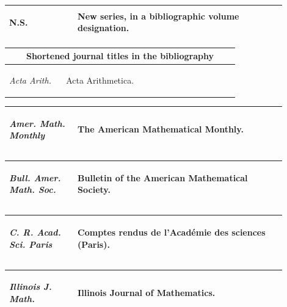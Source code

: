 \documentclass[11pt,reqno]{amsart}
\theoremstyle{blueplain}
\numberwithin{equation}{section}
\def\hyperlink#1#2{#2}}
\begin{document}
\par\setlength{\parskip}{0pt}\nointerlineskip
\noindent
\begin{tabular}{|@{}p{0.22500\linewidth}|p{0.67500\linewidth}|}\hline
\hypertarget{abbr:N.S.}{}\hyperlink{abbr-source:Srinivasan1961}{\textsf{N.S.}} & New series, in a bibliographic volume designation.\\\hline
\end{tabular}%
\par\setlength{\parskip}{0pt}\nointerlineskip
\noindent
\begin{tabular}{|@{}p{0.22500\linewidth}|p{0.67500\linewidth}|}\hline
\multicolumn{2}{|c|}{\textbf{Shortened journal titles in the bibliography}}\\\hline
\hypertarget{abbr:journal-Acta-Arith}{}\hyperlink{abbr-source:Haneke1962}{\emph{Acta Arith.}} & Acta Arithmetica.\\\hline
\end{tabular}%
\par\setlength{\parskip}{0pt}\nointerlineskip
\noindent
\begin{tabular}{|@{}p{0.22500\linewidth}|p{0.67500\linewidth}|}\hline
\hypertarget{abbr:journal-Amer-Math-Monthly}{}\hyperlink{abbr-source:Wright1951}{\emph{Amer. Math. Monthly}} & The American Mathematical Monthly.\\\hline
\end{tabular}%
\par\setlength{\parskip}{0pt}\nointerlineskip
\noindent
\begin{tabular}{|@{}p{0.22500\linewidth}|p{0.67500\linewidth}|}\hline
\hypertarget{abbr:journal-Bull-Amer-Math-Soc}{}\hyperlink{abbr-source:Mills1947}{\emph{Bull. Amer. Math. Soc.}} & Bulletin of the American Mathematical Society.\\\hline
\end{tabular}%
\par\setlength{\parskip}{0pt}\nointerlineskip
\noindent
\begin{tabular}{|@{}p{0.22500\linewidth}|p{0.67500\linewidth}|}\hline
\hypertarget{abbr:journal-C-R-Acad-Sci-Paris}{}\hyperlink{abbr-source:Sierpinski1952}{\emph{C. R. Acad. Sci. Paris}} & Comptes rendus de l'Acad\'emie des sciences (Paris).\\\hline
\end{tabular}%
\par\setlength{\parskip}{0pt}\nointerlineskip
\noindent
\begin{tabular}{|@{}p{0.22500\linewidth}|p{0.67500\linewidth}|}\hline
\hypertarget{abbr:journal-Illinois-J-Math}{}\hyperlink{abbr-source:BennettMartinOBryantRechnitzer2018}{\emph{Illinois J. Math.}} & Illinois Journal of Mathematics.\\\hline
\end{tabular}%
\end{document}
